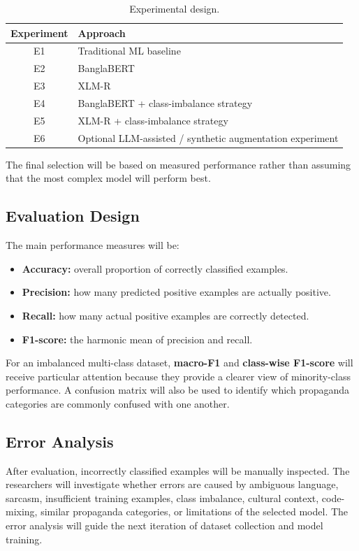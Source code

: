 \begin{table}[H]
\centering
\caption{Experimental design.}\label{tab:experiments}
\renewcommand{\arraystretch}{1.25}
\begin{tabular}{@{}cl@{}}
\toprule
\textbf{Experiment} & \textbf{Approach}\\
\midrule
E1 & Traditional ML baseline\\
E2 & BanglaBERT\\
E3 & XLM-R\\
E4 & BanglaBERT + class-imbalance strategy\\
E5 & XLM-R + class-imbalance strategy\\
E6 & Optional LLM-assisted / synthetic augmentation experiment\\
\bottomrule
\end{tabular}
\end{table}
The final selection will be based on measured performance rather than assuming that
the most complex model will perform best.

\subsection{Evaluation Design}
The main performance measures will be:
\begin{itemize}
  \item \textbf{Accuracy:} overall proportion of correctly classified examples.
  \item \textbf{Precision:} how many predicted positive examples are actually positive.
  \item \textbf{Recall:} how many actual positive examples are correctly detected.
  \item \textbf{F1-score:} the harmonic mean of precision and recall.
\end{itemize}
For an imbalanced multi-class dataset, \textbf{macro-F1} and \textbf{class-wise
F1-score} will receive particular attention because they provide a clearer view of
minority-class performance. A confusion matrix will also be used to identify which
propaganda categories are commonly confused with one another.

\subsection{Error Analysis}
After evaluation, incorrectly classified examples will be manually inspected. The
researchers will investigate whether errors are caused by ambiguous language,
sarcasm, insufficient training examples, class imbalance, cultural context,
code-mixing, similar propaganda categories, or limitations of the selected model.
The error analysis will guide the next iteration of dataset collection and model
training.

